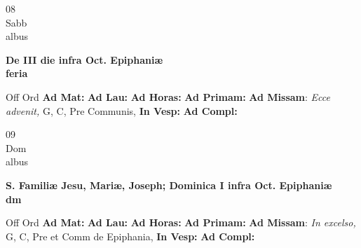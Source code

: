 \documentclass[10pt, openany]{book}
\begin{document}
        \begin{center}
            \begin{minipage}{3.5in}
                \vspace{2em}
                \begin{minipage}{0.5in}
                    {\Huge 08} \\
                    {\normalsize Sabb} \\
                    {\normalsize albus}
                \end{minipage}
                \begin{minipage}{3.0in}
                    \textbf{ \large De III die infra Oct. Epiphaniæ \\
                    \textnormal{\normalsize feria}} \\ 
                \end{minipage}
                \begin{justify}Off Ord
                    \textbf{Ad Mat: }
                    \textbf{Ad Lau: }
                    \textbf{Ad Horas: }
                    \textbf{Ad Primam: }\textbf{Ad Missam}: \textit{Ecce advenit,} G, C, Pre Communis,  
                    \textbf{In Vesp: }
                    \textbf{Ad Compl: }
                \end{justify}
            \end{minipage}
        \end{center}
    
        \begin{center}
            \begin{minipage}{3.5in}
                \vspace{2em}
                \begin{minipage}{0.5in}
                    {\Huge 09} \\
                    {\normalsize Dom} \\
                    {\normalsize albus}
                \end{minipage}
                \begin{minipage}{3.0in}
                    \textbf{ \large S. Familiæ Jesu, Mariæ, Joseph; Dominica I infra Oct. Epiphaniæ \\
                    \textnormal{\normalsize dm}} \\ 
                \end{minipage}
                \begin{justify}Off Ord
                    \textbf{Ad Mat: }
                    \textbf{Ad Lau: }
                    \textbf{Ad Horas: }
                    \textbf{Ad Primam: }\textbf{Ad Missam}: \textit{In excelso,} G, C, Pre et Comm de Epiphania,  
                    \textbf{In Vesp: }
                    \textbf{Ad Compl: }
                \end{justify}
            \end{minipage}
        \end{center}
    
\end{document}
